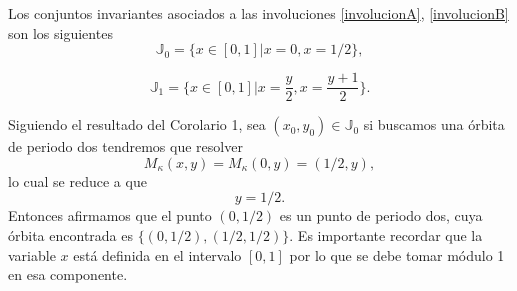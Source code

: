 Los conjuntos invariantes asociados a las involuciones \eqref{involucionA}, \eqref{involucionB} son los siguientes
\begin{equation}
\mathbb{J}_{0} = \{ x \in [0,1] |x=0, x=1/2\},
\label{invariantejA}
\end{equation}

\begin{equation}
\mathbb{J}_{1} = \{ x \in [0,1] |x=\frac{y}{2}, x=\frac{y+1}{2}\}.
\label{invariantejB}
\end{equation}

Siguiendo el resultado del Corolario 1, sea $(x_{0},y_{0})\in \mathbb{J}_{0}$ si buscamos una \'orbita de periodo dos tendremos que resolver 
\begin{equation*}
M_{\kappa}(x,y) = M_{\kappa}(0,y)=(1/2,y),
\end{equation*}
lo cual se reduce a que
\begin{equation*}
y=1/2.
\end{equation*}
Entonces afirmamos que el punto $(0,1/2)$ es un punto de periodo dos, cuya \'orbita encontrada es $\{(0,1/2), (1/2,1/2)\}$. Es importante recordar que la variable $x$ est\'a definida en el intervalo $[0,1]$ por lo que se debe tomar m\'odulo 1 en esa componente. \\

